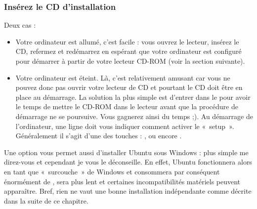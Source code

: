 \subsubsection{Insérez le CD d'installation}
Deux cas :
\begin{itemize}
\item Votre ordinateur est allumé, c'est facile : vous ouvrez le lecteur, insérez le CD, refermez et redémarrez en espérant que votre ordinateur est configuré pour démarrer à partir de votre lecteur CD-ROM (voir la section suivante).
\item Votre ordinateur est éteint. Là, c'est relativement amusant car vous ne pouvez donc pas ouvrir votre lecteur de CD et pourtant le CD doit être en place au démarrage. La solution la plus simple est d'entrer dans le  pour avoir le temps de mettre le CD-ROM dans le lecteur avant que la procédure de démarrage ne se poursuive. Vous gagnerez ainsi du temps ;). Au démarrage de l'ordinateur, une ligne doit vous indiquer comment activer le «~setup~». Généralement il s'agit d'une des touches : ,  ou encore .
\end{itemize}
\begin{nota}
Une option vous permet aussi d'installer Ubuntu sous Windows : plus simple me direz-vous et cependant je vous le déconseille. En effet, Ubuntu fonctionnera alors en tant que  «~surcouche~» de Windows et consommera par conséquent énormément de , sera plus lent et certaines incompatibilités matériels peuvent apparaître. Bref, rien ne vaut une bonne installation indépendante comme décrite dans la suite de ce chapitre.
\end{nota}
